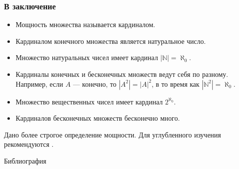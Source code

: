 \appendix


\begin{frame}
    \frametitle{В заключение}
    
    \begin{itemize}
        \item Мощность множества называется кардиналом.
        \item Кардиналом конечного множества является натуральное число.
        \item Множество натуральных чисел имеет кардинал $|\mathbb{N}|=\aleph_0$.
        \item Кардиналы конечных и бесконечных множеств ведут себя по разному. Например, если $A$ --- конечно, то $|A^2|=|A|^2$, в то время как $|\mathbb{N}^2|=\aleph_0$.
        \item Множество вещественных чисел имеет кардинал $2^{\aleph_0}$.
        \item Кардиналов бесконечных множеств бесконечно много.
    \end{itemize}
    
    Дано более строгое определение мощности. Для углубленного изучения рекомендуются \cite{bib:sudoplatov:discrmath,bib:shaporev:discretemath}.
    
\end{frame}


\begin{frame}[allowframebreaks]{Библиография}
    
    
\end{frame}

